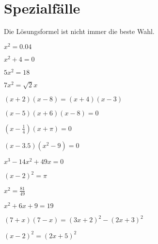 \section{Spezialfälle}
Die Lösungsformel ist nicht immer die beste Wahl.
\begin{bbwAufgabenBlock}
\item $x^2 = 0.04$

\item $ x^2 + 4= 0$
\LoesungsBlock{$\lx= \left\{ \right\}$}

\item $ 5x^2= 18$

\item $ 7x^2= \sqrt{2} x$

\item $ (x+2)(x-8) = (x+4)(x-3)$

\item $ (x-5) (x+6) (x-8)= 0$

\item $ (x-\frac14)(x+\pi)= 0$

\item $ (x-3.5)(x^2-9)= 0$

\item $ x^3 -14x^2 + 49x=  0$

\item $ (x-2)^2= \pi$

\item $x^2 = \frac{81}{49}$

\item $x^2 + 6x + 9 = 19$

\item $ (7+x)(7-x)= (3x+2)^2 - (2x + 3)^2$

\item $ (x-2)^2 = (2x+5)^2$

\end{bbwAufgabenBlock}
\newpage

